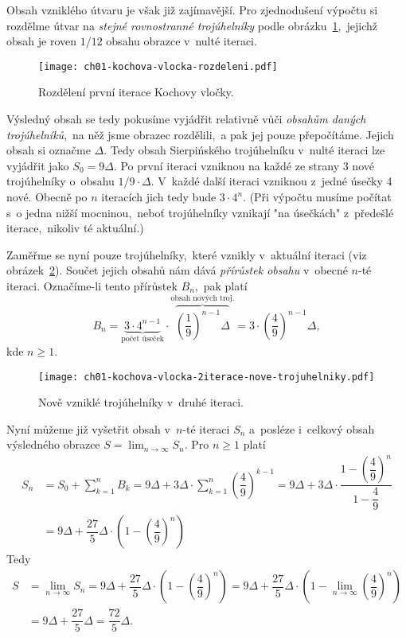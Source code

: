 Obsah vzniklého útvaru je však již zajímavější. Pro zjednodušení výpočtu si rozdělme útvar na \emph{stejné rovnostranné trojúhelníky} podle obrázku~\ref{fig:kochova_vlocka_rozdeleni},~jejichž obsah je roven $1/12$ obsahu obrazce v~nulté iteraci.
\begin{figure}[h]
    \centering
    \texttt{[image: ch01-kochova-vlocka-rozdeleni.pdf]}
    \caption{Rozdělení první iterace Kochovy vločky.}
    \label{fig:kochova_vlocka_rozdeleni}
\end{figure}
Výsledný obsah se tedy pokusíme vyjádřit relativně vůči \emph{obsahům daných trojúhelníků},~na něž jsme obrazec rozdělili,~a pak jej pouze přepočítáme. Jejich obsah si označme $\Delta$. Tedy obsah Sierpińského trojúhelníku v~nulté iteraci lze vyjádřit jako $S_0=9\Delta$. Po první iteraci vzniknou na každé ze strany 3 nové trojúhelníky o~obsahu $1/9\cdot\Delta$. V~každé další iteraci vzniknou z~jedné úsečky 4 nové. Obecně po $n$ iteracích jich tedy bude $3\cdot 4^{n}$. (Při výpočtu musíme počítat s~o jedna nižší mocninou,~neboť trojúhelníky vznikají "na úsečkách" z~předešlé iterace,~nikoliv té aktuální.)\par
Zaměřme se nyní pouze trojúhelníky,~které vznikly v~aktuální iteraci (viz obrázek~\ref{fig:kochova_vlocka_2iterace_nove_trojuhelniky}). Součet jejich obsahů nám dává \emph{přírůstek obsahu} v~obecné $n$-té iteraci. Označíme-li tento přírůstek $B_n$,~pak platí
\[B_n=\underbrace{3\cdot 4^{n-1}}_{\text{počet úseček}}\cdot\overbrace{\left(\dfrac{1}{9}\right)^{n-1}\Delta}^{\text{obsah nových troj.}}=3\cdot\left(\dfrac{4}{9}\right)^{n-1}\Delta,\]
kde $n\geqslant 1$.
\begin{figure}[h]
    \centering
    \texttt{[image: ch01-kochova-vlocka-2iterace-nove-trojuhelniky.pdf]}
    \caption{Nově vzniklé trojúhelníky v~druhé iteraci.}
    \label{fig:kochova_vlocka_2iterace_nove_trojuhelniky}
\end{figure}
Nyní můžeme již vyšetřit obsah v~$n$-té iteraci $S_n$ a~posléze i~celkový obsah výsledného obrazce $S=\lim_{n\to\infty}{S_n}$. Pro $n\geqslant 1$ platí
\begin{align*}
    S_n&=S_0+\sum_{k=1}^{n}{B_k}=9\Delta+3\Delta\cdot\sum_{k=1}^{n}{\left(\dfrac{4}{9}\right)^{k-1}}=9\Delta+3\Delta\cdot\dfrac{1-\left(\dfrac{4}{9}\right)^{n}}{1-\dfrac{4}{9}}\\
    &=9\Delta+\dfrac{27}{5}\Delta\cdot\left(1-\left(\dfrac{4}{9}\right)^n\right)
\end{align*}
Tedy
\begin{align*}
    S&=\lim_{n\to\infty}{S_n}=9\Delta+\dfrac{27}{5}\Delta\cdot\left(1-\left(\dfrac{4}{9}\right)^n\right)=9\Delta+\dfrac{27}{5}\Delta\cdot\left(1-\lim_{n\to\infty}\left(\dfrac{4}{9}\right)^n\right)\\
    &=9\Delta+\dfrac{27}{5}\Delta=\dfrac{72}{5}\Delta.
\end{align*}
